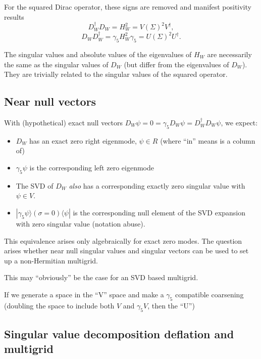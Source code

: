 \documentclass[letter,10pt]{report}
\begin{document}
For the squared Dirac operator, these signs are removed and manifest positivity results
$$
D_W^\dagger D_W = H_W^2 = V (\Sigma)^2 V^\dagger,
$$
$$
D_W D_W^\dagger = \gamma_5 H_W^2 \gamma_5= U (\Sigma)^2 U^\dagger.
$$

The singular values and absolute values of the eigenvalues of $H_W$ are necessarily the same as the singular values of $D_W$ (but differ from the eigenvalues of $D_W$). They are trivially
related to the singular values of the squared operator.


\subsection{Near null vectors}

With (hypothetical) exact null vectors $D_W \psi = 0 = \gamma_5 D_W \psi = D_W^\dagger D_W \psi$, we expect:
\begin{itemize}
  \item $D_W$ has an exact zero right eigenmode, $\psi \in R$ (where ``in'' means is a column of)
  \item $\gamma_5 \psi$ is the corresponding left zero eigenmode
  \item The SVD of $D_W$ \emph{also} has a corresponding exactly zero singular value
        with $\psi \in V$.
  \item $|\gamma_5 \psi \rangle (\sigma=0) \langle \psi |$ is the corresponding null element of the SVD expansion with zero singular value (notation abuse).
\end{itemize}

This equivalence arises only algebraically for exact zero modes.
The question arises whether near null singular values and singular vectors can be used
to set up a non-Hermitian multigrid.

This may ``obviously'' be the case for an SVD based multigrid.

If we generate a space in the ``V'' space and make a $\gamma_5$ compatible coarsening (doubling the space to include
both $V$ and $\gamma_5 V$, then the ``U'')


\subsection{Singular value decomposition deflation and multigrid}
\end{document}
